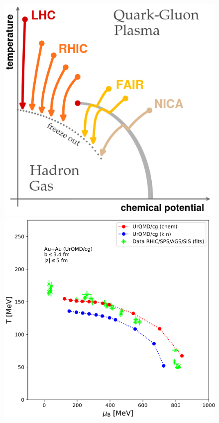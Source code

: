 \documentclass[aspectratio=1610]{beamer}
\begin{document}
\begin{frame}
\begin{columns}
\begin{column}{0.4\textwidth}
\begin{figure}
\includegraphics[scale=0.2]{figs/QCD_Phase_diagram_2021_Gelis.png} \\
\includegraphics[scale=0.2]{figs/abc.png} 
 \end{figure}
\end{column}
\end{columns}

\end{frame}
\end{document}
